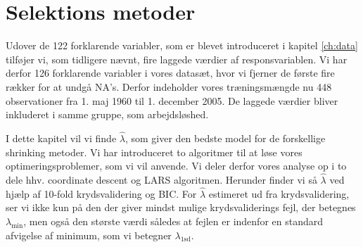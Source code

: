 \chapter{Selektions metoder}
Udover de 122 forklarende variabler, som er blevet introduceret i kapitel \ref{ch:data} tilføjer vi, som tidligere nævnt, fire laggede værdier af responsvariablen.  
Vi har derfor 126 forklarende variabler i vores datasæt, hvor vi fjerner de første fire rækker for at undgå NA's. 
Derfor indeholder vores træningsmængde nu 448 observationer fra 1. maj 1960 til 1. december 2005. 
De laggede værdier bliver inkluderet i samme gruppe, som arbejdsløshed. 

I dette kapitel vil vi finde $\widehat\lambda$, som giver den bedste model for de forskellige shrinking metoder. 
Vi har introduceret to algoritmer til at løse vores optimeringsproblemer, som vi vil anvende.
Vi deler derfor vores analyse op i to dele  hhv. coordinate descent og LARS algoritmen.
Herunder finder vi så  $\widehat\lambda$ ved hjælp af 10-fold krydsvalidering og BIC. 
For $\widehat\lambda$ estimeret ud fra krydsvalidering, ser vi ikke kun på den der giver mindst mulige krydsvaliderings fejl, der betegnes $\lambda_{\min}$, men også den største værdi således at fejlen er indenfor en standard afvigelse af minimum, som vi betegner $\lambda_{\text{1sd}}$.  




